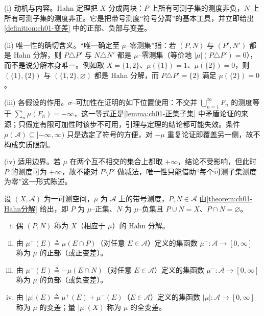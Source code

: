 \documentclass[../../main.tex]{subfiles}%
\begin{document}
\begin{remark}\label{remark:ch01-Hahn分解动机}
(i) 动机与内容。Hahn 定理把 $X$ 分成两块：$P$ 上所有可测子集的测度非负，$N$ 上所有可测子集的测度非正。它是把带号测度“符号分离”的基本工具，并立即给出\cref{definition:ch01-变差} 中的正部、负部与变差。

(ii) 唯一性的确切含义。“唯一确定至 $\mu$--零测集”指：若 $(P,N)$ 与 $(P',N')$ 都是 Hahn 分解，则 $P\triangle P'$ 与 $N\triangle N'$ 都是 $\mu$--零测集（等价地 $|\mu|(P\triangle P')=0$），而不是说分解本身唯一。例如取 $X=\{1,2\}$、$\mu(\{1\})=1$、$\mu(\{2\})=0$，则 $(\{1\},\{2\})$ 与 $(\{1,2\},\varnothing)$ 都是 Hahn 分解，而 $P\triangle P'=\{2\}$ 满足 $\mu(\{2\})=0$。

(iii) 各假设的作用。$\sigma$--可加性在证明的如下位置使用：不交并 $\bigcup_{n=1}^\infty F_n$ 的测度等于 $\sum_n\mu(F_n)=-\infty$，这一等式正是\cref{lemma:ch01-正集子集} 中矛盾论证的来源；只假定有限可加性时该步不可用，引理与定理的结论都可能失效。条件 $\mu(\mathcal{A})\subseteq[-\infty,\infty)$ 只是选定了符号的方便，对 $-\mu$ 重复论证即覆盖另一侧，故不构成实质限制。

(iv) 适用边界。若 $\mu$ 在两个互不相交的集合上都取 $+\infty$，结论不受影响，但此时 $P$ 的测度可为 $+\infty$，故不能对 $P\setminus P'$ 做减法，唯一性只能借助“每个可测子集测度为零”这一形式陈述。
\end{remark}

\begin{definition}\label{definition:ch01-变差}
设 $(X,\mathcal{A})$ 为一可测空间，$\mu$ 为 $\mathcal{A}$ 上的带号测度，$P,N\in\mathcal{A}$ 由\cref{theorem:ch01-Hahn分解} 给出，即 $P$ 为 $\mu$--正集、$N$ 为 $\mu$--负集且 $P\cup N=X$、$P\cap N=\varnothing$。
\begin{enumerate}[(i)]
\item 偶 $(P,N)$ 称为 $X$（相应于 $\mu$）的 Hahn 分解。
\item 由 $\mu^+(E)\triangleq\mu(E\cap P)$（对任意 $E\in\mathcal{A}$）定义的集函数 $\mu^+:\mathcal{A}\to[0,\infty]$ 称为 $\mu$ 的正部（或正变差）。
\item 由 $\mu^-(E)\triangleq-\mu(E\cap N)$（对任意 $E\in\mathcal{A}$）定义的集函数 $\mu^-:\mathcal{A}\to[0,\infty]$ 称为 $\mu$ 的负部（或负变差）。
\item 由 $|\mu|(E)\triangleq\mu^+(E)+\mu^-(E)$（$E\in\mathcal{A}$）定义的集函数 $|\mu|:\mathcal{A}\to[0,\infty]$ 称为 $\mu$ 的变差；量 $|\mu|(X)$ 称为 $\mu$ 的全变差。
\end{enumerate}
\end{definition}
\end{document}
